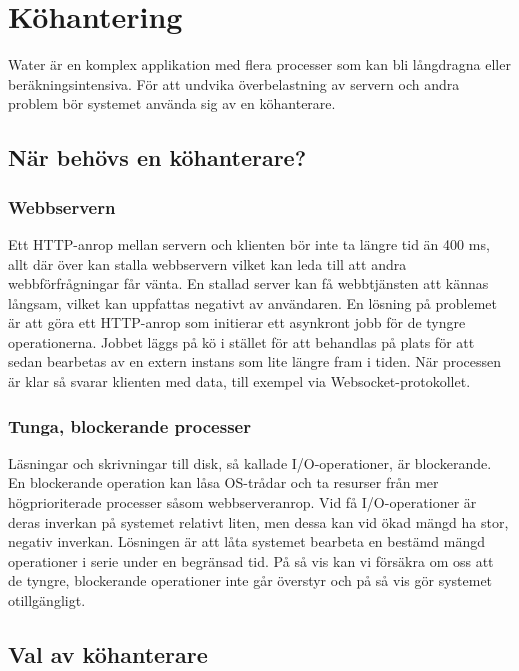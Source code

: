 \section{Köhantering}
\label{section:kohanterare}

Water är en komplex applikation med flera processer som kan bli långdragna eller beräkningsintensiva. För att undvika överbelastning av servern och andra problem bör systemet använda sig av en köhanterare.

\subsection{När behövs en köhanterare?}

\subsubsection{Webbservern}

Ett HTTP-anrop mellan servern och klienten bör inte ta längre tid än 400 ms, allt där över kan stalla webbservern vilket kan leda till att andra webbförfrågningar får vänta. En stallad server kan få webbtjänsten att kännas långsam, vilket kan uppfattas negativt av användaren.
En lösning på problemet är att göra ett HTTP-anrop som initierar ett asynkront jobb för de tyngre operationerna. Jobbet läggs på kö i stället för att behandlas på plats för att sedan bearbetas av en extern instans som lite längre fram i tiden. När processen är klar så svarar klienten med data, till exempel via Websocket-protokollet.

\subsubsection{Tunga, blockerande processer}

Läsningar och skrivningar till disk, så kallade I/O-operationer, är blockerande. En blockerande operation kan låsa OS-trådar och ta resurser från mer högprioriterade processer såsom webbserveranrop.
Vid få I/O-operationer är deras inverkan på systemet relativt liten, men dessa kan vid ökad mängd ha stor, negativ inverkan.
Lösningen är att låta systemet bearbeta en bestämd mängd operationer i serie under en begränsad tid. På så vis kan vi försäkra om oss att de tyngre, blockerande operationer inte går överstyr och på så vis gör systemet otillgängligt.

\subsection{Val av köhanterare}

